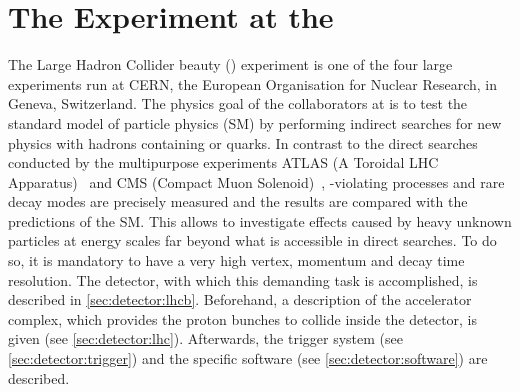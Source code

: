 
\chapter{The \lhcb Experiment at the \lhc}
\label{sec:detector}

The Large Hadron Collider beauty (\lhcb) experiment is one of the four large
experiments run at CERN, the European Organisation for Nuclear Research, in
Geneva, Switzerland. The physics goal of the collaborators at \lhcb is to test
the standard model of particle physics (SM) by performing indirect searches
for new physics with hadrons containing \bquark or \cquark quarks. In contrast
to the direct searches conducted by the multipurpose experiments ATLAS (A
Toroidal LHC Apparatus)~\cite{ATLAS} and CMS (Compact Muon
Solenoid)~\cite{CMS}, \CP-violating processes and rare decay modes are
precisely measured and the results are compared with the predictions of the
SM. This allows to investigate effects caused by heavy unknown particles at
energy scales far beyond what is accessible in direct searches. To do so, it is
mandatory to have a very high vertex, momentum and decay time resolution. The
detector, with which this demanding task is accomplished, is described in
\cref{sec:detector:lhcb}. Beforehand, a description of the accelerator
complex, which provides the proton bunches to collide inside the detector, is
given (see \cref{sec:detector:lhc}). Afterwards, the trigger system (see
\cref{sec:detector:trigger}) and the specific software (see
\cref{sec:detector:software}) are described.







